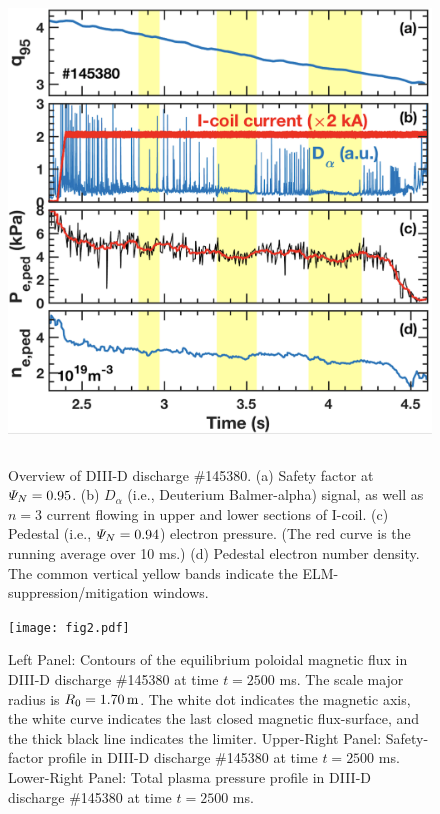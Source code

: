 \documentclass[12pt,prb,aps]{revtex4-1}
\begin{document}
\newpage

\begin{figure}
\includegraphics[height=5in]{fig1.pdf}
\caption{Overview of DIII-D discharge \#145380.
(a) Safety factor at  ${\mit\Psi}_N=0.95$. 
(b) $D_\alpha$ (i.e., Deuterium Balmer-alpha) signal, as well as $n=3$ current flowing in upper and lower sections of I-coil. 
(c) Pedestal (i.e., ${\mit\Psi}_N=0.94$)
electron pressure. (The red curve is the running average over 10 ms.) (d) Pedestal electron number density. The common vertical yellow bands indicate the ELM-suppression/mitigation windows.}\label{fig1}
\end{figure}

\begin{figure}
\texttt{[image: fig2.pdf]}
\caption{Left Panel: Contours of the equilibrium poloidal
magnetic flux in   DIII-D discharge \#145380 at time $t=2500$ ms. The scale major radius is $R_0=1.70\,{\rm m}$. The white dot indicates the magnetic axis, the white curve indicates the
last closed magnetic flux-surface, and the thick black line indicates the limiter. 
Upper-Right Panel: Safety-factor profile in DIII-D discharge \#145380 at time $t=2500$ ms. Lower-Right Panel:  Total plasma pressure profile in DIII-D discharge \#145380 at time $t=2500$ ms. } \label{fig2}
\end{figure}
\end{document}
